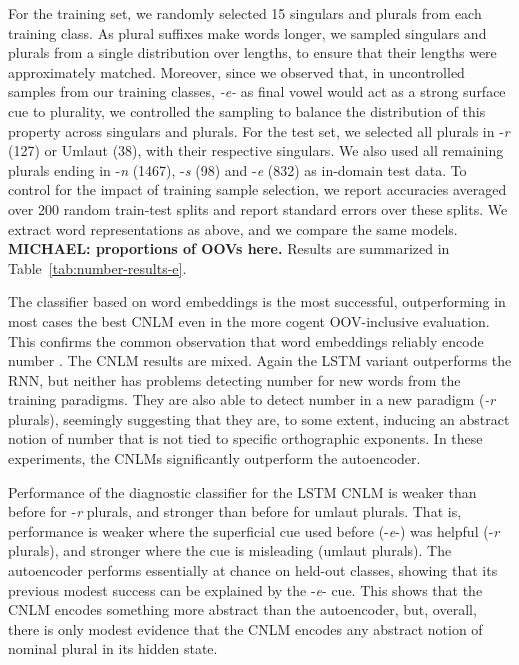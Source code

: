 For the training set, we randomly selected 15 singulars and plurals
from each training class.  As plural suffixes make words longer, we
sampled singulars and
plurals %
from a single distribution over lengths, to ensure that their lengths
were approximately matched. Moreover, since we observed that, in
uncontrolled samples from our training classes, \emph{-e-} as final
vowel would act as a strong surface cue to plurality, we controlled
the sampling to balance the distribution of this property across
singulars and plurals. For the test set, we selected all plurals
in -\emph{r} (127) or Umlaut (38), with their respective
singulars. %
We also used all remaining plurals ending in -\emph{n} (1467), -\emph{s} (98) and -\emph{e} (832) as in-domain test data.
To control for the impact of training sample selection, we
report accuracies averaged over 200 random train-test splits and report standard errors over these splits.  We extract word
representations as above, and we compare the same models. \textbf{MICHAEL: proportions of OOVs here.} %
Results are summarized in Table~\ref{tab:number-results-e}.

The classifier based on word embeddings is the most successful,
outperforming in most cases the best CNLM even in the more cogent
OOV-inclusive evaluation. This confirms the common observation that
word embeddings reliably encode number \cite{Mikolov:etal:2013a}. The
CNLM results are mixed. Again the LSTM variant outperforms the
RNN, but neither has problems detecting number for new words from
the training paradigms. They are also able to detect number in a new
paradigm (\emph{-r} plurals), seemingly suggesting that they are, to some extent,
inducing an abstract notion of number that is not tied to specific
orthographic exponents. In these experiments, the CNLMs significantly
outperform the autoencoder. %


Performance of the diagnostic classifier for the LSTM CNLM is weaker than before for -\emph{r} plurals, and stronger than before for umlaut plurals.
That is, performance is weaker where the superficial cue used before (-\emph{e}-) was helpful (-\emph{r} plurals), and stronger where the cue is misleading (umlaut plurals).
The autoencoder performs essentially at chance on held-out classes, showing that its previous modest success can be explained by the -\emph{e}- cue.
This shows that the CNLM encodes something more abstract than the autoencoder, but, overall, there is only modest evidence that the CNLM encodes any abstract notion of nominal plural in its hidden state.



